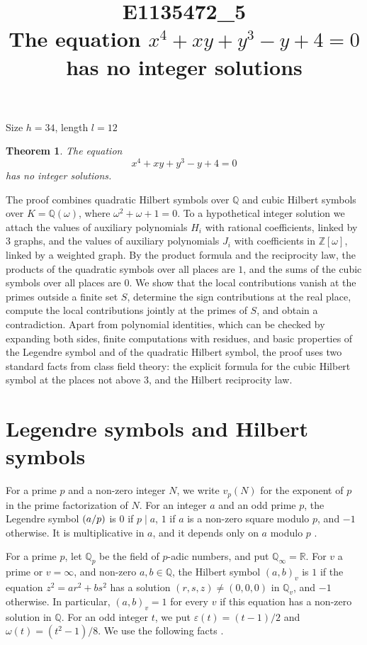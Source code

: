 \documentclass[11pt]{article}
\title{\textbf{E1135472\_5}\\[4pt] {\Large The equation $x^{4}+xy+y^{3}-y+4=0$ has no integer solutions}}
\author{}
\date{}
\newtheorem{theorem}{Theorem}
\newcommand{\Z}{\mathbb{Z}}
\newcommand{\Q}{\mathbb{Q}}
\newcommand{\leg}[2]{\mathchoice{\biggl(\dfrac{#1}{#2}\biggr)}{(#1/#2)}{(#1/#2)}{(#1/#2)}}
\begin{document}
\maketitle
\vspace{-8ex}
\begin{center}
Size $h=34$, length $l=12$
\end{center}

\begin{theorem}\label{thm:main}
The equation
\begin{equation}\label{eq:main}
x^{4}+xy+y^{3}-y+4=0
\end{equation}
has no integer solutions.
\end{theorem}

The proof combines quadratic Hilbert symbols over $\Q$ and cubic Hilbert symbols over $K=\Q(\omega)$, where $\omega^2+\omega+1=0$. To a hypothetical integer solution we attach the values of auxiliary polynomials $H_i$ with rational coefficients, linked by 3 graphs, and the values of auxiliary polynomials $J_i$ with coefficients in $\Z[\omega]$, linked by a weighted graph. By the product formula and the reciprocity law, the products of the quadratic symbols over all places are $1$, and the sums of the cubic symbols over all places are $0$. We show that the local contributions vanish at the primes outside a finite set $S$, determine the sign contributions at the real place, compute the local contributions jointly at the primes of $S$, and obtain a contradiction. Apart from polynomial identities, which can be checked by expanding both sides, finite computations with residues, and basic properties of the Legendre symbol and of the quadratic Hilbert symbol, the proof uses two standard facts from class field theory: the explicit formula for the cubic Hilbert symbol at the places not above $3$, and the Hilbert reciprocity law.

\section{Legendre symbols and Hilbert symbols}

For a prime $p$ and a non-zero integer $N$, we write $v_p(N)$ for the exponent of $p$ in the prime factorization of $N$. For an integer $a$ and an odd prime $p$, the Legendre symbol $\leg{a}{p}$ is $0$ if $p\mid a$, $1$ if $a$ is a non-zero square modulo $p$, and $-1$ otherwise. It is multiplicative in $a$, and it depends only on $a$ modulo $p$ \cite[Chapter~5]{IR}.

For a prime $p$, let $\Q_p$ be the field of $p$-adic numbers, and put $\Q_\infty=\mathbb R$. For $v$ a prime or $v=\infty$, and non-zero $a,b\in\Q$, the Hilbert symbol $(a,b)_v$ is $1$ if the equation $z^2=ar^2+bs^2$ has a solution $(r,s,z)\neq(0,0,0)$ in $\Q_v$, and $-1$ otherwise. In particular, $(a,b)_v=1$ for every $v$ if this equation has a non-zero solution in $\Q$. For an odd integer $t$, we put $\varepsilon(t)=(t-1)/2$ and $\omega(t)=(t^2-1)/8$. We use the following facts \cite[Chapter~III, Proposition~2 and Theorems~1 and~3]{Se}.
\end{document}
